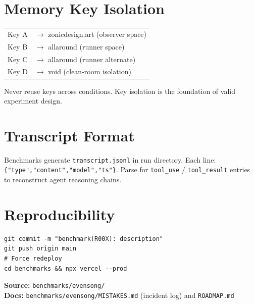 \documentclass[11pt,a4paper]{article}
\begin{document}
\section{Memory Key Isolation}
\begin{tabular}{ll}
Key A & $\rightarrow$ zonicdesign.art \quad (observer space) \\
Key B & $\rightarrow$ allaround \quad (runner space) \\
Key C & $\rightarrow$ allaround \quad (runner alternate) \\
Key D & $\rightarrow$ void \quad (clean-room isolation)
\end{tabular}

Never reuse keys across conditions. Key isolation is the foundation of valid experiment design.

\section{Transcript Format}

Benchmarks generate \texttt{transcript.jsonl} in run directory. Each line: \texttt{\{"type","content","model","ts"\}}. Parse for \texttt{tool\_use} / \texttt{tool\_result} entries to reconstruct agent reasoning chains.

\section{Reproducibility}

\begin{verbatim}
git commit -m "benchmark(R00X): description"
git push origin main
# Force redeploy
cd benchmarks && npx vercel --prod
\end{verbatim}

\vfill

\textbf{Source:} \texttt{benchmarks/evensong/}\\
\textbf{Docs:} \texttt{benchmarks/evensong/MISTAKES.md} (incident log) and \texttt{ROADMAP.md}
\end{document}
